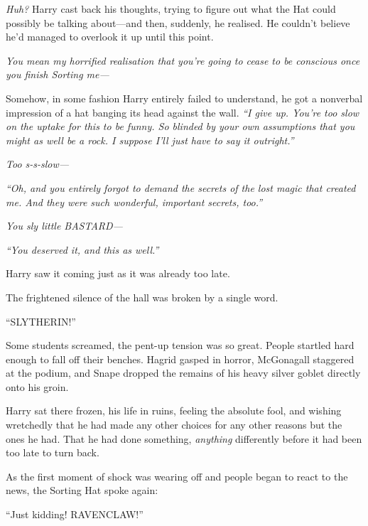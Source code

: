 \emph{Huh?} Harry cast back his thoughts, trying to figure out what the
Hat could possibly be talking about---and then, suddenly, he realised.
He couldn't believe he'd managed to overlook it up until this point.

\emph{You mean my horrified realisation that you're going to cease to be
conscious once you finish Sorting me---}

Somehow, in some fashion Harry entirely failed to understand, he got a
nonverbal impression of a hat banging its head against the wall.
\emph{``I give up. You're too slow on the uptake for this to be funny.
So blinded by your own assumptions that you might as well be a rock. I
suppose I'll just have to say it outright.''}

\emph{Too s-s-slow---}

\emph{``Oh, and you entirely forgot to demand the secrets of the lost
magic that created me. And they were such wonderful, important secrets,
too.''}

\emph{You sly little BASTARD---}

\emph{``You deserved it, and this as well.''}

Harry saw it coming just as it was already too late.

The frightened silence of the hall was broken by a single word.

``SLYTHERIN!''

Some students screamed, the pent-up tension was so great. People
startled hard enough to fall off their benches. Hagrid gasped in horror,
McGonagall staggered at the podium, and Snape dropped the remains of his
heavy silver goblet directly onto his groin.

Harry sat there frozen, his life in ruins, feeling the absolute fool,
and wishing wretchedly that he had made any other choices for any other
reasons but the ones he had. That he had done something, \emph{anything}
differently before it had been too late to turn back.

As the first moment of shock was wearing off and people began to react
to the news, the Sorting Hat spoke again:

``Just kidding! RAVENCLAW!''
